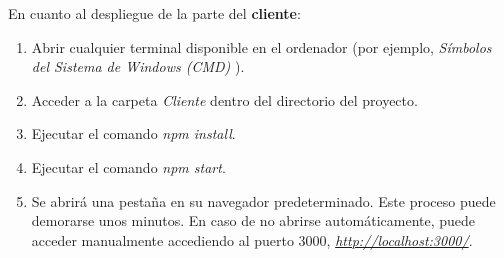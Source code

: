 En cuanto al despliegue de la parte del {\bf cliente}:
\begin{enumerate}
\item Abrir cualquier terminal disponible en el ordenador (por ejemplo, {\it Símbolos del Sistema de Windows (CMD)} \cite{cmd}).
\item Acceder a la carpeta {\it Cliente} dentro del directorio del proyecto.
\item Ejecutar el comando {\it npm install}.
\item Ejecutar el comando {\it npm start}.
\item Se abrirá una pestaña en su navegador predeterminado. Este proceso puede demorarse unos minutos. En caso de no abrirse automáticamente, puede acceder manualmente accediendo al puerto 3000, {\it \url{http://localhost:3000/}}.
\end{enumerate}
